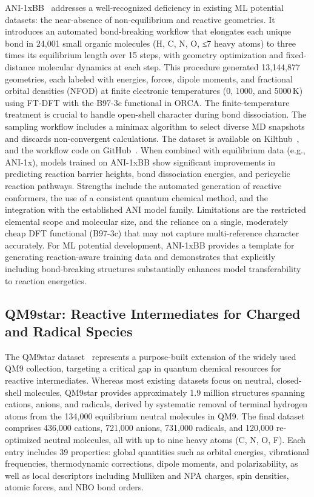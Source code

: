 \documentclass[12pt]{article}
\begin{document}
ANI-1xBB~\cite{ds47-1} addresses a well-recognized deficiency in existing ML potential datasets: the near-absence of non-equilibrium and reactive geometries. It introduces an automated bond-breaking workflow that elongates each unique bond in 24,001 small organic molecules (H, C, N, O, ≤7 heavy atoms) to three times its equilibrium length over 15 steps, with geometry optimization and fixed-distance molecular dynamics at each step. This procedure generated 13,144,877 geometries, each labeled with energies, forces, dipole moments, and fractional orbital densities (NFOD) at finite electronic temperatures (0, 1000, and 5000 K) using FT-DFT with the B97-3c functional in ORCA. The finite-temperature treatment is crucial to handle open-shell character during bond dissociation. The sampling workflow includes a minimax algorithm to select diverse MD snapshots and discards non-convergent calculations. The dataset is available on Kilthub~\cite{ds47-6}, and the workflow code on GitHub~\cite{ds47-1}. When combined with equilibrium data (e.g., ANI-1x), models trained on ANI-1xBB show significant improvements in predicting reaction barrier heights, bond dissociation energies, and pericyclic reaction pathways. Strengths include the automated generation of reactive conformers, the use of a consistent quantum chemical method, and the integration with the established ANI model family. Limitations are the restricted elemental scope and molecular size, and the reliance on a single, moderately cheap DFT functional (B97-3c) that may not capture multi-reference character accurately. For ML potential development, ANI-1xBB provides a template for generating reaction-aware training data and demonstrates that explicitly including bond-breaking structures substantially enhances model transferability to reaction energetics.

\subsection{QM9star: Reactive Intermediates for Charged and Radical Species}

The QM9star dataset~\cite{ds49-1,ds49-2,ds49-3,ds49-4} represents a purpose-built extension of the widely used QM9 collection, targeting a critical gap in quantum chemical resources for reactive intermediates. Whereas most existing datasets focus on neutral, closed-shell molecules, QM9star provides approximately 1.9 million structures spanning cations, anions, and radicals, derived by systematic removal of terminal hydrogen atoms from the 134,000 equilibrium neutral molecules in QM9. The final dataset comprises 436,000 cations, 721,000 anions, 731,000 radicals, and 120,000 re-optimized neutral molecules, all with up to nine heavy atoms (C, N, O, F). Each entry includes 39 properties: global quantities such as orbital energies, vibrational frequencies, thermodynamic corrections, dipole moments, and polarizability, as well as local descriptors including Mulliken and NPA charges, spin densities, atomic forces, and NBO bond orders.
\end{document}
